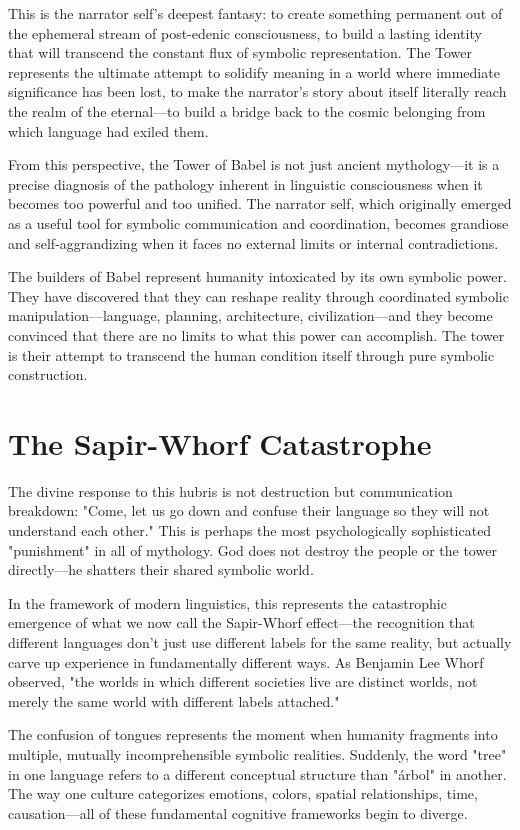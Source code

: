 This is the narrator self's deepest fantasy: to create something permanent out of the ephemeral stream of post-edenic consciousness, to build a lasting identity that will transcend the constant flux of symbolic representation. The Tower represents the ultimate attempt to solidify meaning in a world where immediate significance has been lost, to make the narrator's story about itself literally reach the realm of the eternal—to build a bridge back to the cosmic belonging from which language had exiled them.

From this perspective, the Tower of Babel is not just ancient mythology—it is a precise diagnosis of the pathology inherent in linguistic consciousness when it becomes too powerful and too unified. The narrator self, which originally emerged as a useful tool for symbolic communication and coordination, becomes grandiose and self-aggrandizing when it faces no external limits or internal contradictions.

The builders of Babel represent humanity intoxicated by its own symbolic power. They have discovered that they can reshape reality through coordinated symbolic manipulation—language, planning, architecture, civilization—and they become convinced that there are no limits to what this power can accomplish. The tower is their attempt to transcend the human condition itself through pure symbolic construction.

\section{The Sapir-Whorf Catastrophe}

The divine response to this hubris is not destruction but communication breakdown: "Come, let us go down and confuse their language so they will not understand each other." This is perhaps the most psychologically sophisticated "punishment" in all of mythology. God does not destroy the people or the tower directly—he shatters their shared symbolic world.

In the framework of modern linguistics, this represents the catastrophic emergence of what we now call the Sapir-Whorf effect—the recognition that different languages don't just use different labels for the same reality, but actually carve up experience in fundamentally different ways. As Benjamin Lee Whorf observed, "the worlds in which different societies live are distinct worlds, not merely the same world with different labels attached."

The confusion of tongues represents the moment when humanity fragments into multiple, mutually incomprehensible symbolic realities. Suddenly, the word "tree" in one language refers to a different conceptual structure than "árbol" in another. The way one culture categorizes emotions, colors, spatial relationships, time, causation—all of these fundamental cognitive frameworks begin to diverge.


